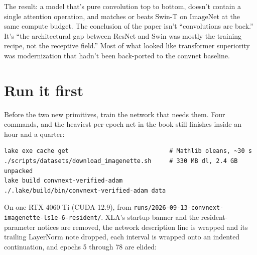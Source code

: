 The result: a model that's pure convolution top to bottom, doesn't
contain a single attention operation, and matches or beats Swin-T
on ImageNet at the same compute budget. The conclusion of the
paper isn't ``convolutions are back.'' It's ``the architectural
gap between ResNet and Swin was mostly the training recipe, not
the receptive field.'' Most of what looked like transformer
superiority was modernization that hadn't been back-ported to the
convnet baseline.

\section{Run it first}
\label{sec:convnext_runit}

Before the two new primitives, train the network that needs them. Four
commands, and the heaviest per-epoch net in the book still finishes
inside an hour and a quarter:

\begin{verbatim}
lake exe cache get                            # Mathlib oleans, ~30 s
./scripts/datasets/download_imagenette.sh     # 330 MB dl, 2.4 GB unpacked
lake build convnext-verified-adam
./.lake/build/bin/convnext-verified-adam data
\end{verbatim}

On one RTX 4060 Ti (CUDA 12.9), from
\texttt{runs/2026-09-13-convnext-imagenette-ls1e-6-resident/}. XLA's
startup banner and the resident-parameter notices are removed, the network
description line is wrapped and its trailing LayerNorm note dropped, each
interval is wrapped onto an indented continuation, and epochs 5 through 78
are elided:

